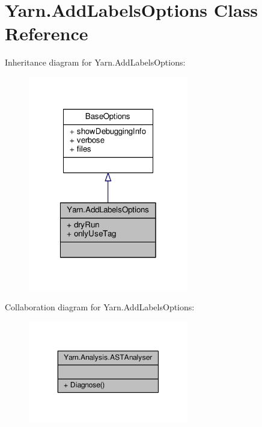 \hypertarget{a00037}{\section{Yarn.\-Add\-Labels\-Options Class Reference}
\label{a00037}
}


Inheritance diagram for Yarn.\-Add\-Labels\-Options\-:
\nopagebreak
\begin{figure}[H]
\begin{center}
\leavevmode
\includegraphics[width=198pt]{a00750}
\end{center}
\end{figure}


Collaboration diagram for Yarn.\-Add\-Labels\-Options\-:
\nopagebreak
\begin{figure}[H]
\begin{center}
\leavevmode
\includegraphics[width=198pt]{a00751}
\end{center}
\end{figure}
